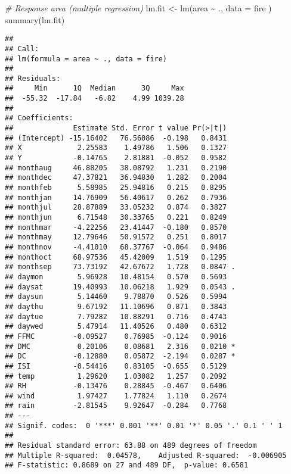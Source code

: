 \documentclass[
]{article}
\newenvironment{Shaded}{\begin{snugshade}}{\end{snugshade}}
\newcommand{\AttributeTok}[1]{\textcolor[rgb]{0.77,0.63,0.00}{#1}}
\newcommand{\CommentTok}[1]{\textcolor[rgb]{0.56,0.35,0.01}{\textit{#1}}}
\newcommand{\FunctionTok}[1]{\textcolor[rgb]{0.00,0.00,0.00}{#1}}
\newcommand{\NormalTok}[1]{#1}
\newcommand{\OtherTok}[1]{\textcolor[rgb]{0.56,0.35,0.01}{#1}}
\newcommand{\SpecialCharTok}[1]{\textcolor[rgb]{0.00,0.00,0.00}{#1}}
\begin{document}
\begin{Shaded}
\begin{Highlighting}[]
\CommentTok{\# Response area (multiple regression)}
\NormalTok{lm.fit }\OtherTok{\textless{}{-}} \FunctionTok{lm}\NormalTok{(area }\SpecialCharTok{\textasciitilde{}}\NormalTok{ ., }\AttributeTok{data =}\NormalTok{ fire )}
\FunctionTok{summary}\NormalTok{(lm.fit)}
\end{Highlighting}
\end{Shaded}

\begin{verbatim}
## 
## Call:
## lm(formula = area ~ ., data = fire)
## 
## Residuals:
##     Min      1Q  Median      3Q     Max 
##  -55.32  -17.84   -6.82    4.99 1039.28 
## 
## Coefficients:
##              Estimate Std. Error t value Pr(>|t|)  
## (Intercept) -15.16402   76.56086  -0.198   0.8431  
## X             2.25583    1.49786   1.506   0.1327  
## Y            -0.14765    2.81881  -0.052   0.9582  
## monthaug     46.88205   38.08792   1.231   0.2190  
## monthdec     47.37821   36.94830   1.282   0.2004  
## monthfeb      5.58985   25.94816   0.215   0.8295  
## monthjan     14.76909   56.40617   0.262   0.7936  
## monthjul     28.87889   33.05232   0.874   0.3827  
## monthjun      6.71548   30.33765   0.221   0.8249  
## monthmar     -4.22256   23.41447  -0.180   0.8570  
## monthmay     12.79646   50.91572   0.251   0.8017  
## monthnov     -4.41010   68.37767  -0.064   0.9486  
## monthoct     68.97536   45.42009   1.519   0.1295  
## monthsep     73.73192   42.67672   1.728   0.0847 .
## daymon        5.96928   10.48154   0.570   0.5693  
## daysat       19.40993   10.06218   1.929   0.0543 .
## daysun        5.14460    9.78870   0.526   0.5994  
## daythu        9.67192   11.10696   0.871   0.3843  
## daytue        7.79282   10.88291   0.716   0.4743  
## daywed        5.47914   11.40526   0.480   0.6312  
## FFMC         -0.09527    0.76985  -0.124   0.9016  
## DMC           0.20106    0.08681   2.316   0.0210 *
## DC           -0.12880    0.05872  -2.194   0.0287 *
## ISI          -0.54416    0.83105  -0.655   0.5129  
## temp          1.29620    1.03082   1.257   0.2092  
## RH           -0.13476    0.28845  -0.467   0.6406  
## wind          1.97427    1.77824   1.110   0.2674  
## rain         -2.81545    9.92647  -0.284   0.7768  
## ---
## Signif. codes:  0 '***' 0.001 '**' 0.01 '*' 0.05 '.' 0.1 ' ' 1
## 
## Residual standard error: 63.88 on 489 degrees of freedom
## Multiple R-squared:  0.04578,    Adjusted R-squared:  -0.006905 
## F-statistic: 0.8689 on 27 and 489 DF,  p-value: 0.6581
\end{verbatim}
\end{document}
